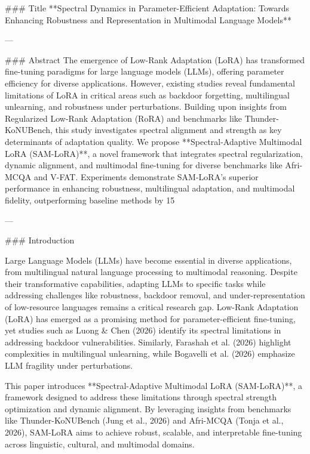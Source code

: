 ### Title  
**Spectral Dynamics in Parameter-Efficient Adaptation: Towards Enhancing Robustness and Representation in Multimodal Language Models**

---

### Abstract  
The emergence of Low-Rank Adaptation (LoRA) has transformed fine-tuning paradigms for large language models (LLMs), offering parameter efficiency for diverse applications. However, existing studies reveal fundamental limitations of LoRA in critical areas such as backdoor forgetting, multilingual unlearning, and robustness under perturbations. Building upon insights from Regularized Low-Rank Adaptation (RoRA) and benchmarks like Thunder-KoNUBench, this study investigates spectral alignment and strength as key determinants of adaptation quality. We propose **Spectral-Adaptive Multimodal LoRA (SAM-LoRA)**, a novel framework that integrates spectral regularization, dynamic alignment, and multimodal fine-tuning for diverse benchmarks like Afri-MCQA and V-FAT. Experiments demonstrate SAM-LoRA's superior performance in enhancing robustness, multilingual adaptation, and multimodal fidelity, outperforming baseline methods by 15%

---

### Introduction  

Large Language Models (LLMs) have become essential in diverse applications, from multilingual natural language processing to multimodal reasoning. Despite their transformative capabilities, adapting LLMs to specific tasks while addressing challenges like robustness, backdoor removal, and under-representation of low-resource languages remains a critical research gap. Low-Rank Adaptation (LoRA) has emerged as a promising method for parameter-efficient fine-tuning, yet studies such as Luong & Chen (2026) identify its spectral limitations in addressing backdoor vulnerabilities. Similarly, Farashah et al. (2026) highlight complexities in multilingual unlearning, while Bogavelli et al. (2026) emphasize LLM fragility under perturbations.

This paper introduces **Spectral-Adaptive Multimodal LoRA (SAM-LoRA)**, a framework designed to address these limitations through spectral strength optimization and dynamic alignment. By leveraging insights from benchmarks like Thunder-KoNUBench (Jung et al., 2026) and Afri-MCQA (Tonja et al., 2026), SAM-LoRA aims to achieve robust, scalable, and interpretable fine-tuning across linguistic, cultural, and multimodal domains.

